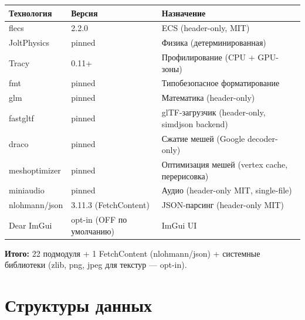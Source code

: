 \begin{longtable}[]{@{}lll@{}}
\toprule\noalign{}
Технология & Версия & Назначение \\
\midrule\noalign{}
\endhead
\bottomrule\noalign{}
\endlastfoot
flecs & 2.2.0 & ECS (header-only, MIT) \\
JoltPhysics & pinned & Физика (детерминированная) \\
Tracy & 0.11+ & Профилирование (CPU + GPU-зоны) \\
fmt & pinned & Типобезопасное форматирование \\
glm & pinned & Математика (header-only) \\
fastgltf & pinned & glTF-загрузчик (header-only, simdjson backend) \\
draco & pinned & Сжатие мешей (Google decoder-only) \\
meshoptimizer & pinned & Оптимизация мешей (vertex cache, перерисовка) \\
miniaudio & pinned & Аудио (header-only MIT, single-file) \\
nlohmann/json & 3.11.3 (FetchContent) & JSON-парсинг (header-only MIT) \\
Dear ImGui & opt-in (OFF по умолчанию) & ImGui UI \\
\end{longtable}

\textbf{Итого:} 22 подмодуля + 1 FetchContent (nlohmann/json) + системные библиотеки (zlib, png, jpeg для текстур --- opt-in).

\section{Структуры данных}\label{KT-2.1_Architecture-ux441ux442ux440ux443ux43aux442ux443ux440ux44b-ux434ux430ux43dux43dux44bux445}

